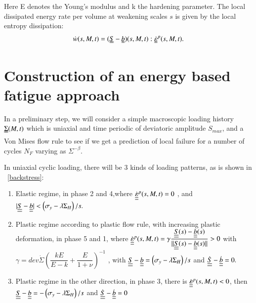 \documentclass[3p,times,number,review]{elsarticle}
\newcommand{\figref}[1]{\figurename~\ref{#1}}
\begin{document}
Here E denotes the Young's modulus and k the hardening parameter. The local dissipated energy rate per volume at weakening scales $s$  is given by the local entropy dissipation:
\begin{equation}
	\dot{w}(s,M,t)=(\uuline{S}-\uuline{b})(s,M,t):\uuline{\dot{\varepsilon}}^p(s,M,t).
	\label{dissipated}
\end{equation}

\section{Construction of an energy based fatigue approach}

In a preliminary step, we will consider a simple macroscopic loading history $\uuline{\Sigma}(M, t)$ which is uniaxial
and time periodic of deviatoric amplitude $S_{max}$, and a Von Mises flow rule to see if we get a prediction of local failure for a number of cycles $N_F$ varying as $\Sigma^{-\beta}.$


\noindent
In uniaxial cyclic loading, there will be 3 kinds of loading patterns, as is shown in \figref{backstress}:

\vspace{6pt}
\begin{enumerate}
	
	\item	Elastic regime, in phase 2 and 4,where $\dot{\uline{\uline{\varepsilon}}}^p(s,M,t)=0$ ,  and $|\uline{\uline{S}}-\uline{\uline{b}}|< \left( \sigma_y-\lambda \Sigma_H\right)/s. $ 
	\vspace{6pt}
	
	\item Plastic regime according to plastic flow rule, with increasing plastic deformation, in phase 5 and 1, where	$\dot{\uline{\uline{\varepsilon}}}^p(s,M,t)=\gamma\dfrac{\uline{\uline{S}}(s)-\uline{\uline{b}}(s)}{||\uline{\uline{S}}(s)-\uline{\uline{b}}(s)||}> 0$ with  $\gamma= dev\dot{\Sigma}\left(\dfrac{kE}{E-k}+\dfrac{E}{1+\nu} \right) ^{-1}$ ,  with $\uline{\uline{S}}-\uline{\uline{b}}= \left(\sigma_y-\lambda \Sigma_H\right)/s$ and $\dot{\uline{\uline{S}}}-\dot{\uline{\uline{b}}}=0.$ 
	\vspace{6pt}
	
	\item Plastic regime in the other direction, in phase 3, there is	$\dot{\uline{\uline{\varepsilon}}}^p(s,M,t)<0$,  then $\uline{\uline{S}}-\uline{\uline{b}}=- \left(\sigma_y-\lambda \Sigma_H\right)/s$ and $\dot{\uline{\uline{S}}}-\dot{\uline{\uline{b}}}=0$ 
	
\end{enumerate}	
\end{document}
